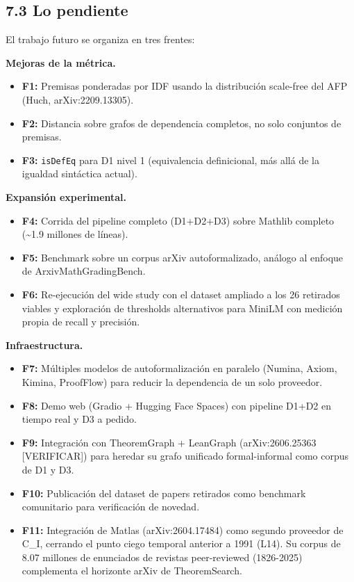 \documentclass[12pt,a4paper]{article}
\theoremstyle{remark}
\begin{document}
\subsection{7.3 Lo pendiente}

El trabajo futuro se organiza en tres frentes:

\textbf{Mejoras de la métrica.}
\begin{itemize}
\item \textbf{F1:} Premisas ponderadas por IDF usando la distribución scale-free del AFP (Huch, arXiv:2209.13305).
\item \textbf{F2:} Distancia sobre grafos de dependencia completos, no solo conjuntos de premisas.
\item \textbf{F3:} \texttt{isDefEq} para D1 nivel 1 (equivalencia definicional, más allá de la igualdad sintáctica actual).
\end{itemize}

\textbf{Expansión experimental.}
\begin{itemize}
\item \textbf{F4:} Corrida del pipeline completo (D1+D2+D3) sobre Mathlib completo (\textasciitilde{}1.9 millones de líneas).
\item \textbf{F5:} Benchmark sobre un corpus arXiv autoformalizado, análogo al enfoque de ArxivMathGradingBench.
\item \textbf{F6:} Re-ejecución del wide study con el dataset ampliado a los 26 retirados viables y exploración de thresholds alternativos para MiniLM con medición propia de recall y precisión.
\end{itemize}

\textbf{Infraestructura.}
\begin{itemize}
\item \textbf{F7:} Múltiples modelos de autoformalización en paralelo (Numina, Axiom, Kimina, ProofFlow) para reducir la dependencia de un solo proveedor.
\item \textbf{F8:} Demo web (Gradio + Hugging Face Spaces) con pipeline D1+D2 en tiempo real y D3 a pedido.
\item \textbf{F9:} Integración con TheoremGraph + LeanGraph (arXiv:2606.25363 [VERIFICAR]) para heredar su grafo unificado formal-informal como corpus de D1 y D3.
\item \textbf{F10:} Publicación del dataset de papers retirados como benchmark comunitario para verificación de novedad.
\item \textbf{F11:} Integración de Matlas (arXiv:2604.17484) como segundo proveedor de C\_I, cerrando el punto ciego temporal anterior a 1991 (L14). Su corpus de 8.07 millones de enunciados de revistas peer-reviewed (1826-2025) complementa el horizonte arXiv de TheoremSearch.
\end{itemize}
\end{document}
